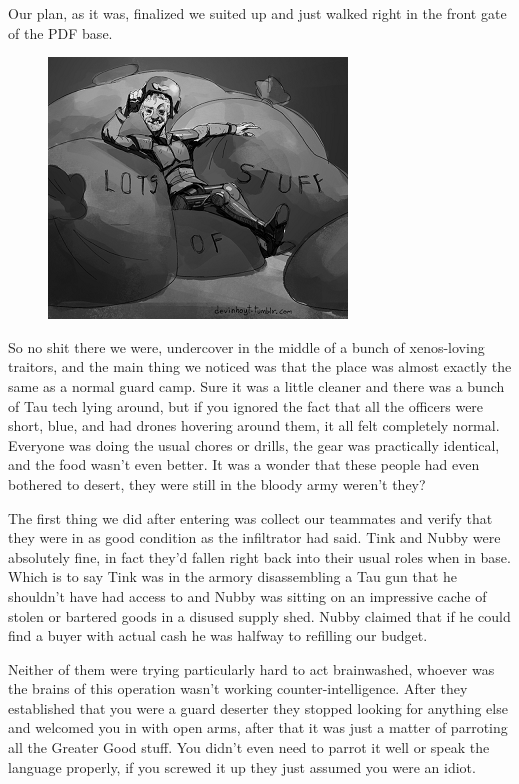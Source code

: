 Our plan, as it was, finalized we suited up and just walked right in the front gate of the PDF base.

\begin{figure}
	\begin{center}
		\includegraphics[width=\figwidth]{pics/10/44b.png}
	\end{center}
\end{figure}
So no shit there we were, undercover in the middle of a bunch of xenos-loving traitors, and the main thing we noticed was that the place was almost exactly the same as a normal guard camp. 
Sure it was a little cleaner and there was a bunch of Tau tech lying around, but if you ignored the fact that all the officers were short, blue, and had drones hovering around them, it all felt completely normal. 
Everyone was doing the usual chores or drills, the gear was practically identical, and the food wasn't even better. 
It was a wonder that these people had even bothered to desert, they were still in the bloody army weren't they?

The first thing we did after entering was collect our teammates and verify that they were in as good condition as the infiltrator had said. 
Tink and Nubby were absolutely fine, in fact they'd fallen right back into their usual roles when in base. 
Which is to say Tink was in the armory disassembling a Tau gun that he shouldn't have had access to and Nubby was sitting on an impressive cache of stolen or bartered goods in a disused supply shed. 
Nubby claimed that if he could find a buyer with actual cash he was halfway to refilling our budget.

Neither of them were trying particularly hard to act brainwashed, whoever was the brains of this operation wasn't working counter-intelligence. 
After they established that you were a guard deserter they stopped looking for anything else and welcomed you in with open arms, after that it was just a matter of parroting all the Greater Good stuff. 
You didn't even need to parrot it well or speak the language properly, if you screwed it up they just assumed you were an idiot.


